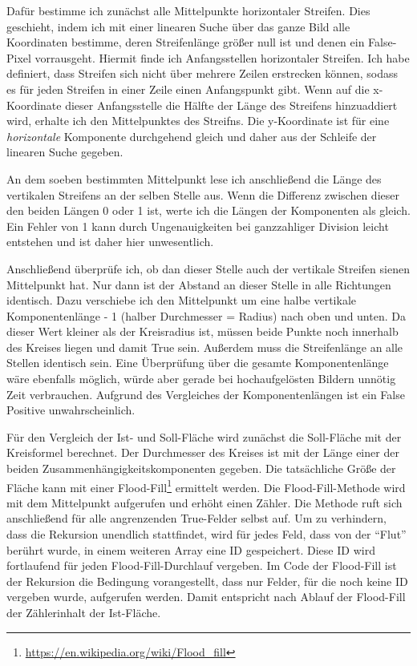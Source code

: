 Dafür bestimme ich zunächst alle Mittelpunkte horizontaler Streifen. Dies geschieht, indem ich mit einer linearen Suche über das ganze Bild alle Koordinaten bestimme, deren Streifenlänge größer null ist und denen ein False-Pixel vorrausgeht. Hiermit finde ich Anfangsstellen horizontaler Streifen. Ich habe definiert, dass Streifen sich nicht über mehrere Zeilen erstrecken können, sodass es für jeden Streifen in einer Zeile einen Anfangspunkt gibt.
Wenn auf die x-Koordinate dieser Anfangsstelle die Hälfte der Länge des  Streifens hinzuaddiert wird, erhalte ich den Mittelpunktes des Streifns. Die y-Koordinate ist für eine \textit{horizontale} Komponente durchgehend gleich und daher aus der Schleife der linearen Suche gegeben.

An dem soeben bestimmten Mittelpunkt lese ich anschließend die Länge des vertikalen Streifens an der selben Stelle aus. Wenn die Differenz zwischen dieser den beiden Längen 0 oder 1 ist, werte ich die Längen der Komponenten als gleich. Ein Fehler von 1 kann durch Ungenauigkeiten bei ganzzahliger Division leicht entstehen und ist daher hier unwesentlich.

Anschließend überprüfe ich, ob dan dieser Stelle auch der vertikale Streifen sienen Mittelpunkt hat. Nur dann ist der Abstand an dieser Stelle in alle Richtungen identisch. Dazu verschiebe ich den Mittelpunkt um eine halbe vertikale Komponentenlänge - 1 (halber Durchmesser = Radius) nach oben und unten. Da dieser Wert kleiner als der Kreisradius ist, müssen beide Punkte noch innerhalb des Kreises liegen und damit True sein. Außerdem muss die Streifenlänge an alle Stellen identisch sein.
Eine Überprüfung über die gesamte Komponentenlänge wäre ebenfalls möglich, würde aber gerade bei hochaufgelösten Bildern unnötig Zeit verbrauchen. Aufgrund des Vergleiches der Komponentenlängen ist ein False Positive unwahrscheinlich.

Für den Vergleich der Ist- und Soll-Fläche wird zunächst die Soll-Fläche mit der Kreisformel berechnet. Der Durchmesser des Kreises ist mit der Länge einer der beiden Zusammenhängigkeitskomponenten gegeben. Die tatsächliche Größe der Fläche kann mit einer Flood-Fill\footnote{\url{https://en.wikipedia.org/wiki/Flood_fill}} ermittelt werden.
Die Flood-Fill-Methode wird mit dem Mittelpunkt aufgerufen und erhöht einen Zähler. Die Methode ruft sich anschließend für alle angrenzenden True-Felder selbst auf. Um zu verhindern, dass die Rekursion unendlich stattfindet, wird für jedes Feld, dass von der "`Flut"' berührt wurde, in einem weiteren Array eine ID gespeichert. Diese ID wird fortlaufend für jeden Flood-Fill-Durchlauf vergeben. Im Code der Flood-Fill ist der Rekursion die Bedingung vorangestellt, dass nur Felder, für die noch keine ID vergeben wurde, aufgerufen werden. Damit entspricht nach Ablauf der Flood-Fill der Zählerinhalt der Ist-Fläche.

